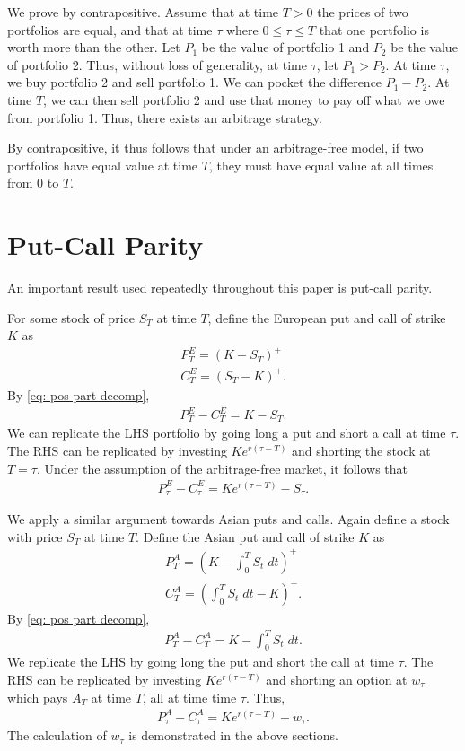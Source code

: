 \documentclass[reqno]{amsart}
\begin{document}
We prove by contrapositive. Assume that at time $T > 0$ the prices of two portfolios are equal, and that at time $\tau$ where $0 \leq \tau \leq T$ that one portfolio is worth more than the other. 
Let $P_1$ be the value of portfolio 1 and $P_2$ be the value of portfolio 2. Thus, without loss of generality, at time $\tau$, let $P_1 > P_2$.
At time $\tau$, we buy portfolio 2 and sell portfolio 1. We can pocket the difference $P_1 - P_2$. At time $T$, we can then sell portfolio 2 and use that money to pay off what we owe from portfolio 1. 
Thus, there exists an arbitrage strategy.

By contrapositive, it thus follows that under an arbitrage-free model, if two portfolios have equal value at time $T$, they must have equal value at all times from $0$ to $T$.

\section{Put-Call Parity}

An important result used repeatedly throughout this paper is put-call parity. 

For some stock of price $S_T$ at time $T$, define the European put and call of strike $K$ as 
\begin{align} 
     P^E_T = (K - S_T)^+ \\
     C^E_T = (S_T - K)^+.
\end{align}
By \eqref{eq: pos part decomp}, 
\begin{align} 
     P^E_T - C^E_T = K - S_T.
\end{align}
We can replicate the LHS portfolio by going long a put and short a call at time $\tau$. The RHS can be replicated by investing $Ke^{r(\tau - T)}$ and shorting the stock at $T = \tau$.
Under the assumption of the arbitrage-free market, it follows that
\begin{align} 
     P^E_\tau - C^E_\tau = Ke^{r(\tau - T)} - S_\tau.
\end{align}

We apply a similar argument towards Asian puts and calls. Again define a stock with price $S_T$ at time $T$. Define the Asian put and call of strike $K$ as
\begin{align} 
     P^A_T = (K - \int_0^T S_t \;dt)^+ \\
     C^A_T = (\int_0^T S_t \;dt - K)^+.
\end{align}
By \eqref{eq: pos part decomp}, 
\begin{align} 
     P^A_T - C^A_T = K - \int_0^T S_t \;dt.
\end{align}
We replicate the LHS by going long the put and short the call at time $\tau$. The RHS can be replicated by investing $Ke^{r(\tau - T)}$ and shorting an option at $w_\tau$ which pays $A_T$ at time $T$, all at time time $\tau$.
Thus, 
\begin{align} 
     P^A_\tau - C^A_\tau = Ke^{r(\tau - T)} - w_\tau.
\end{align}
The calculation of $w_\tau$ is demonstrated in the above sections.
\end{document}
